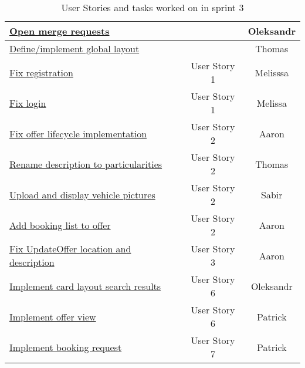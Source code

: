 \begin{table}[h]
    \centering
    \caption{\label{tab:user-stories-sprint-3}User Stories and tasks worked on in sprint 3}
    \begin{tabular}{|l|c|c|}
        \hline
        \href{https://gitlab.rz.uni-bamberg.de/swt/teaching/2021-ws/swt-swl-b/group-a/-/issues/80}{Open merge requests} &  & Oleksandr \\
        \hline
        \href{https://gitlab.rz.uni-bamberg.de/swt/teaching/2021-ws/swt-swl-b/group-a/-/issues/63}{Define/implement global layout} &  & Thomas \\
        \hline
        \href{https://gitlab.rz.uni-bamberg.de/swt/teaching/2021-ws/swt-swl-b/group-a/-/issues/66}{Fix registration} & User Story 1 & Melisssa \\
        \hline
        \href{https://gitlab.rz.uni-bamberg.de/swt/teaching/2021-ws/swt-swl-b/group-a/-/issues/65}{Fix login} & User Story 1 & Melissa \\
        \hline
        \href{https://gitlab.rz.uni-bamberg.de/swt/teaching/2021-ws/swt-swl-b/group-a/-/issues/77}{Fix offer lifecycle implementation} & User Story 2 & Aaron \\
        \hline
        \href{https://gitlab.rz.uni-bamberg.de/swt/teaching/2021-ws/swt-swl-b/group-a/-/issues/76}{Rename description to particularities} & User Story 2 & Thomas \\
        \hline
        \href{https://gitlab.rz.uni-bamberg.de/swt/teaching/2021-ws/swt-swl-b/group-a/-/issues/67}{Upload and display vehicle pictures} & User Story 2 & Sabir \\
        \hline
        \href{https://gitlab.rz.uni-bamberg.de/swt/teaching/2021-ws/swt-swl-b/group-a/-/issues/74}{Add booking list to offer} & User Story 2 & Aaron \\
        \hline
        \href{https://gitlab.rz.uni-bamberg.de/swt/teaching/2021-ws/swt-swl-b/group-a/-/issues/64}{Fix UpdateOffer location and description} & User Story 3 & Aaron \\
        \hline
        \href{https://gitlab.rz.uni-bamberg.de/swt/teaching/2021-ws/swt-swl-b/group-a/-/issues/79}{Implement card layout search results} & User Story 6 & Oleksandr \\
        \hline
        \href{https://gitlab.rz.uni-bamberg.de/swt/teaching/2021-ws/swt-swl-b/group-a/-/issues/84}{Implement offer view} & User Story 6 & Patrick \\
        \hline
        \href{https://gitlab.rz.uni-bamberg.de/swt/teaching/2021-ws/swt-swl-b/group-a/-/issues/69}{Implement booking request} & User Story 7 & Patrick \\

\end{tabular}
\end{table}
